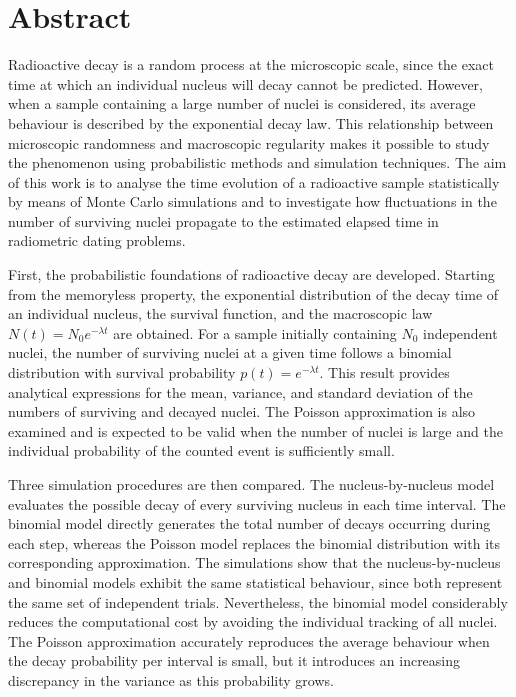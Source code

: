 \documentclass[12pt,a4paper]{article}
\begin{document}
\newpage
\section*{Abstract}

Radioactive decay is a random process at the microscopic scale, since the exact time at which an individual nucleus will decay cannot be predicted. However, when a sample containing a large number of nuclei is considered, its average behaviour is described by the exponential decay law. This relationship between microscopic randomness and macroscopic regularity makes it possible to study the phenomenon using probabilistic methods and simulation techniques. The aim of this work is to analyse the time evolution of a radioactive sample statistically by means of Monte Carlo simulations and to investigate how fluctuations in the number of surviving nuclei propagate to the estimated elapsed time in radiometric dating problems.

First, the probabilistic foundations of radioactive decay are developed. Starting from the memoryless property, the exponential distribution of the decay time of an individual nucleus, the survival function, and the macroscopic law $N(t)=N_0e^{-\lambda t}$ are obtained. For a sample initially containing $N_0$ independent nuclei, the number of surviving nuclei at a given time follows a binomial distribution with survival probability $p(t)=e^{-\lambda t}$. This result provides analytical expressions for the mean, variance, and standard deviation of the numbers of surviving and decayed nuclei. The Poisson approximation is also examined and is expected to be valid when the number of nuclei is large and the individual probability of the counted event is sufficiently small.

Three simulation procedures are then compared. The nucleus-by-nucleus model evaluates the possible decay of every surviving nucleus in each time interval. The binomial model directly generates the total number of decays occurring during each step, whereas the Poisson model replaces the binomial distribution with its corresponding approximation. The simulations show that the nucleus-by-nucleus and binomial models exhibit the same statistical behaviour, since both represent the same set of independent trials. Nevertheless, the binomial model considerably reduces the computational cost by avoiding the individual tracking of all nuclei. The Poisson approximation accurately reproduces the average behaviour when the decay probability per interval is small, but it introduces an increasing discrepancy in the variance as this probability grows.
\end{document}

